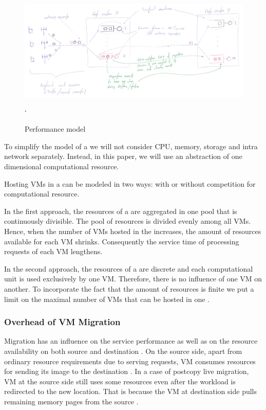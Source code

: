 \subsection{\Dc}
\begin{figure}[tb]
	\centering
	\includegraphics[width=\linewidth]{dc_model.jpg} 
	\caption{Performance model}
	\label{fig:performance_model}`
\end{figure}

To simplify the model of a \dc we will not consider CPU, memory, storage and intra \dc network separately.
Instead, in this paper, we will use an abstraction of one dimensional computational resource.

Hosting VMs in a \dc can be modeled in two ways: with or without competition for computational resource.

In the first approach, the resources of a \dc are aggregated in one pool that is continuously divisible.
The pool of resources is divided evenly among all VMs.
Hence, when the number of VMs hosted in the \dc increases, the amount of resources available for each VM shrinks.
Consequently the service time of processing requests of each VM lengthens.

In the second approach, the resources of a \dc are discrete and each computational unit is used exclusively by one VM.
Therefore, there is no influence of one VM on another.
To incorporate the fact that the amount of resources is finite we put a limit on the maximal number of VMs that can be hosted in one \dc.

\subsubsection{Overhead of VM Migration}
Migration has an influence on the service performance as well as on the resource availability on both source and destination \dc.
On the source side, apart from ordinary resource requirements due to serving requests, VM consumes resources for sending its image to the destination \dc.
In a case of postcopy live migration, VM at the source side still uses some resources even after the workload is redirected to the new location.
That is because the VM at destination side pulls remaining memory pages from the source \dc.


